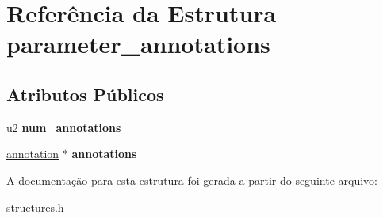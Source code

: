 \hypertarget{structparameter__annotations}{}\section{Referência da Estrutura parameter\+\_\+annotations}
\label{structparameter__annotations}
\subsection*{Atributos Públicos}
\begin{DoxyCompactItemize}
\item 
\mbox{\label{structparameter__annotations_a7e5f9ee8189799d0424e291025d3c3fd}} 
u2 {\bfseries num\+\_\+annotations}
\item 
\mbox{\label{structparameter__annotations_a89a4aee9ee71512a1f33395506db9d60}} 
\hyperlink{structannotation}{annotation} $\ast$ {\bfseries annotations}
\end{DoxyCompactItemize}


A documentação para esta estrutura foi gerada a partir do seguinte arquivo\+:\begin{DoxyCompactItemize}
\item 
structures.\+h\end{DoxyCompactItemize}
